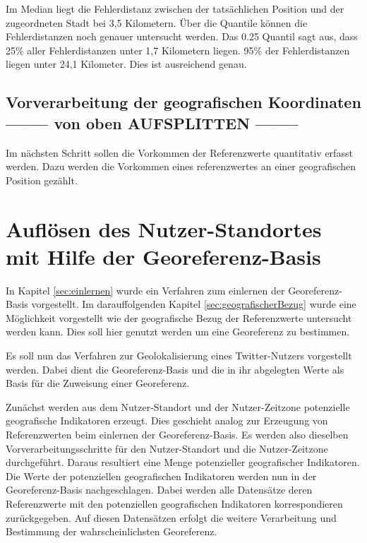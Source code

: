 					Im Median liegt die Fehlerdistanz zwischen der tatsächlichen Position und der zugeordneten Stadt bei 3,5 Kilometern.
					Über die Quantile können die Fehlerdistanzen noch genauer untersucht werden.
					Das 0.25 Quantil sagt aus, dass 25\% aller Fehlerdistanzen unter 1,7 Kilometern liegen.
					95\% der Fehlerdistanzen liegen unter 24,1 Kilometer. 
					Dies ist ausreichend genau. 

		\subsection{Vorverarbeitung der geografischen Koordinaten -------- von oben AUFSPLITTEN --------} 

			Im nächsten Schritt sollen die Vorkommen der Referenzwerte quantitativ erfasst werden. 
			Dazu werden die Vorkommen eines referenzwertes an einer geografischen Position gezählt. 

	\section{Auflösen des Nutzer-Standortes mit Hilfe der Georeferenz-Basis} 

		In Kapitel \ref{sec:einlernen} wurde ein Verfahren zum einlernen der Georeferenz-Basis vorgestellt. 
		Im darauffolgenden Kapitel \ref{sec:geografischerBezug} wurde eine Möglichkeit vorgestellt wie der geografische Bezug der Referenzwerte untersucht werden kann.
		Dies soll hier genutzt werden um eine Georeferenz zu bestimmen. 

		Es soll nun das Verfahren zur Geolokalisierung eines Twitter-Nutzers vorgestellt werden.
		Dabei dient die Georeferenz-Basis und die in ihr abgelegten Werte als Basis für die Zuweisung einer Georeferenz.

		Zunächst werden aus dem Nutzer-Standort und der Nutzer-Zeitzone potenzielle geografische Indikatoren erzeugt.
		Dies geschieht analog zur Erzeugung von Referenzwerten beim einlernen der Georeferenz-Basis.
		Es werden also dieselben Vorverarbeitungsschritte für den Nutzer-Standort und die Nutzer-Zeitzone durchgeführt.
		Daraus resultiert eine Menge potenzieller geografischer Indikatoren.
		Die Werte der potenziellen geografischen Indikatoren werden nun in der Georeferenz-Basis nachgeschlagen. 
		Dabei werden alle Datensätze deren Referenzwerte mit den potenziellen geografischen Indikatoren korrespondieren zurückgegeben.
		Auf diesen Datensätzen erfolgt die weitere Verarbeitung und Bestimmung der wahrscheinlichsten Georeferenz.
		
